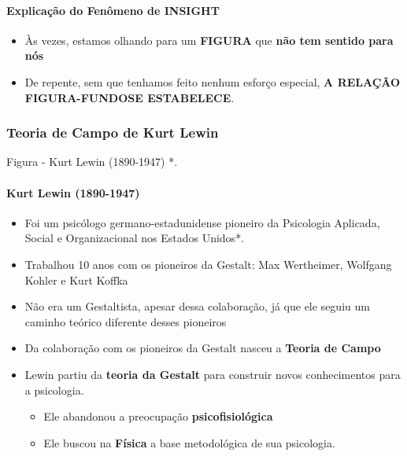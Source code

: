 \documentclass[
]{book}
\providecommand{\tightlist}{%
  \setlength{\itemsep}{0pt}\setlength{\parskip}{0pt}}
\begin{document}
\hypertarget{explicauxe7uxe3o-do-fenuxf4meno-de-insight}{%
\paragraph{Explicação do Fenômeno de INSIGHT}\label{explicauxe7uxe3o-do-fenuxf4meno-de-insight}}

\begin{itemize}
\tightlist
\item
  Às vezes, estamos olhando para um \textbf{FIGURA} que \textbf{não tem sentido para nós}
\item
  De repente, sem que tenhamos feito nenhum esforço especial, \textbf{A RELAÇÃO FIGURA-FUNDOSE ESTABELECE}.
\end{itemize}

\hypertarget{teoria-de-campo-de-kurt-lewin}{%
\subsubsection{\texorpdfstring{Teoria de Campo de \textbf{Kurt Lewin}}{Teoria de Campo de Kurt Lewin}}\label{teoria-de-campo-de-kurt-lewin}}

Figura - Kurt Lewin (1890-1947) *.

\hypertarget{kurt-lewin-1890-1947}{%
\paragraph{Kurt Lewin (1890-1947)}\label{kurt-lewin-1890-1947}}

\begin{itemize}
\tightlist
\item
  Foi um psicólogo germano-estadunidense pioneiro da Psicologia Aplicada, Social e Organizacional nos Estados Unidos*.
\item
  Trabalhou 10 anos com os pioneiros da Gestalt: Max Wertheimer, Wolfgang Kohler e Kurt Koffka
\item
  Não era um Gestaltista, apesar dessa colaboração, já que ele seguiu um caminho teórico diferente desses pioneiros
\item
  Da colaboração com os pioneiros da Gestalt nasceu a \textbf{Teoria de Campo}
\item
  Lewin partiu da \textbf{teoria da Gestalt} para construir novos conhecimentos para a psicologia.

  \begin{itemize}
  \tightlist
  \item
    Ele abandonou a preocupação \textbf{psicofisiológica}
  \item
    Ele buscou na \textbf{Física} a base metodológica de sua psicologia.
  \end{itemize}
\end{itemize}
\end{document}
